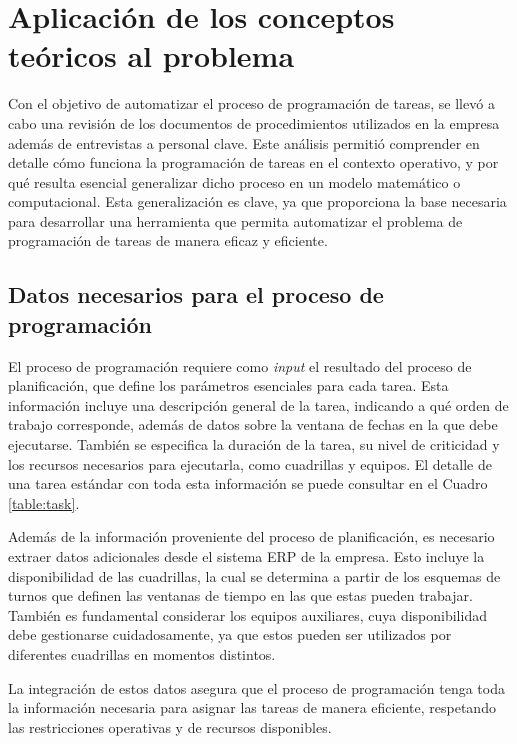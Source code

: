 \documentclass{article}
\begin{document}
\section{Aplicación de los conceptos teóricos al problema}


Con el objetivo de automatizar el proceso de programación de tareas, se llevó a cabo una revisión de los documentos de procedimientos utilizados en la empresa además de entrevistas a personal clave. Este análisis permitió comprender en detalle cómo funciona la programación de tareas en el contexto operativo, y por qué resulta esencial generalizar dicho proceso en un modelo matemático o computacional. Esta generalización es clave, ya que proporciona la base necesaria para desarrollar una herramienta que permita automatizar el problema de programación de tareas de manera eficaz y eficiente.

\subsection{Datos necesarios para el proceso de programación}  

El proceso de programación requiere como \textit{input} el resultado del proceso de planificación, que define los parámetros esenciales para cada tarea. Esta información incluye una descripción general de la tarea, indicando a qué orden de trabajo corresponde, además de datos sobre la ventana de fechas en la que debe ejecutarse. También se especifica la duración de la tarea, su nivel de criticidad y los recursos necesarios para ejecutarla, como cuadrillas y equipos. El detalle de una tarea estándar con toda esta información se puede consultar en el Cuadro \ref{table:task}.  

Además de la información proveniente del proceso de planificación, es necesario extraer datos adicionales desde el sistema ERP de la empresa. Esto incluye la disponibilidad de las cuadrillas, la cual se determina a partir de los esquemas de turnos que definen las ventanas de tiempo en las que estas pueden trabajar. También es fundamental considerar los equipos auxiliares, cuya disponibilidad debe gestionarse cuidadosamente, ya que estos pueden ser utilizados por diferentes cuadrillas en momentos distintos.  

La integración de estos datos asegura que el proceso de programación tenga toda la información necesaria para asignar las tareas de manera eficiente, respetando las restricciones operativas y de recursos disponibles.  
\end{document}
